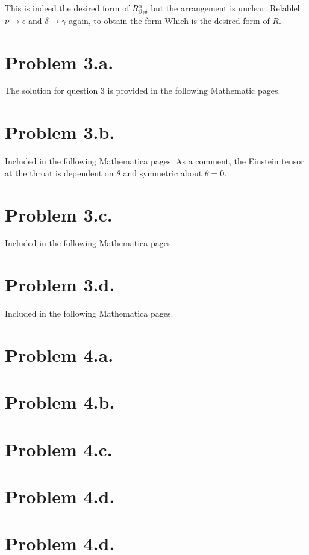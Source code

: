 \documentclass{article}
\begin{document}
This is indeed the desired form of $R^\alpha_{\beta\gamma\delta}$ but the arrangement is unclear. Relablel $\nu\rightarrow\epsilon$ and $\delta\rightarrow\gamma$ again, to obtain the form
Which is the desired form of $R$.
\section*{Problem 3.a.}
The solution for question 3 is provided in the following Mathematic pages.
\section*{Problem 3.b.}
Included in the following Mathematica pages. As a comment, the Einstein tensor at the throat is dependent on $\theta$ and symmetric about $\theta=0$.
\section*{Problem 3.c.}
Included in the following Mathematica pages.
\section*{Problem 3.d.}
Included in the following Mathematica pages.

\section*{Problem 4.a.}

\section*{Problem 4.b.}
\section*{Problem 4.c.}
\section*{Problem 4.d.}
\section*{Problem 4.d.}
\end{document}
